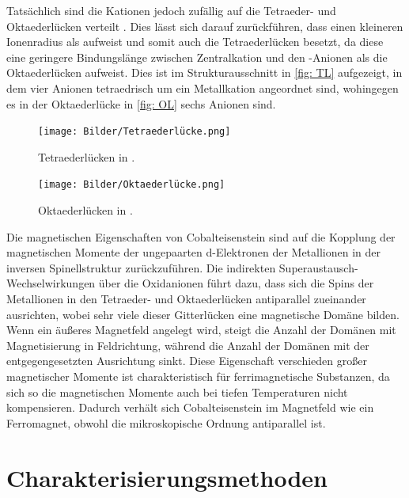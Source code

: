 \documentclass[a4paper,12pt,bibliography=totocnumbered]{scrartcl}
\begin{document}
Tatsächlich sind die Kationen jedoch zufällig auf die Tetraeder- und Oktaederlücken verteilt \cite{Rieck}.
Dies lässt sich darauf zurückführen, dass  einen kleineren Ionenradius als  aufweist und somit auch die Tetraederlücken besetzt, da diese eine geringere Bindungslänge zwischen Zentralkation und den -Anionen als die Oktaederlücken aufweist.
Dies ist im Strukturausschnitt in \autoref{fig: TL} aufgezeigt, in dem vier Anionen tetraedrisch um ein Metallkation angeordnet sind, wohingegen es in der Oktaederlücke in \autoref{fig: OL} sechs Anionen sind.


\begin{figure}[H]
    \centering
    \texttt{[image: Bilder/Tetraederlücke.png]}
    \caption{Tetraederlücken in .\cite{Rieck}}
    \label{fig: TL}
\end{figure}

\begin{figure}[H]
    \centering
    \texttt{[image: Bilder/Oktaederlücke.png]}
    \caption{Oktaederlücken in .\cite{Rieck}}
    \label{fig: OL}
\end{figure}

Die magnetischen Eigenschaften von Cobalteisenstein sind auf die Kopplung der magnetischen Momente der ungepaarten d-Elektronen der Metallionen in  der inversen Spinellstruktur zurückzuführen. \cite{Müller}
Die indirekten Superaustausch-Wechselwirkungen über die Oxidanionen führt dazu, dass sich die Spins der Metallionen in den Tetraeder- und Oktaederlücken antiparallel zueinander ausrichten, wobei sehr viele dieser Gitterlücken eine magnetische Domäne bilden. \\
Wenn ein äußeres Magnetfeld angelegt wird, steigt die Anzahl der Domänen mit Magnetisierung in Feldrichtung, während die Anzahl der Domänen mit der entgegengesetzten Ausrichtung sinkt. 
Diese Eigenschaft verschieden großer magnetischer Momente ist charakteristisch für ferrimagnetische Substanzen, da sich so die magnetischen Momente auch bei tiefen Temperaturen nicht kompensieren. 
Dadurch verhält sich Cobalteisenstein im Magnetfeld wie ein Ferromagnet, obwohl die mikroskopische Ordnung antiparallel ist. \cite{Müller}

\section{Charakterisierungsmethoden}
\end{document}

